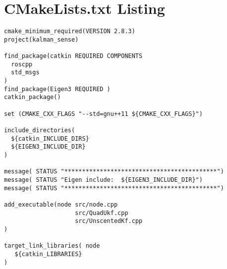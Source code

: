 \chapter{CMakeLists.txt Listing}

\begin{verbatim}
cmake_minimum_required(VERSION 2.8.3)
project(kalman_sense)

find_package(catkin REQUIRED COMPONENTS
  roscpp
  std_msgs
)
find_package(Eigen3 REQUIRED )
catkin_package()

set (CMAKE_CXX_FLAGS "--std=gnu++11 ${CMAKE_CXX_FLAGS}")

include_directories(
  ${catkin_INCLUDE_DIRS}
  ${EIGEN3_INCLUDE_DIR}
)

message( STATUS "*******************************************")
message( STATUS "Eigen include:  ${EIGEN3_INCLUDE_DIR}")
message( STATUS "*******************************************")

add_executable(node src/node.cpp
                    src/QuadUkf.cpp
                    src/UnscentedKf.cpp
)

target_link_libraries( node
   ${catkin_LIBRARIES}
)
\end{verbatim}
